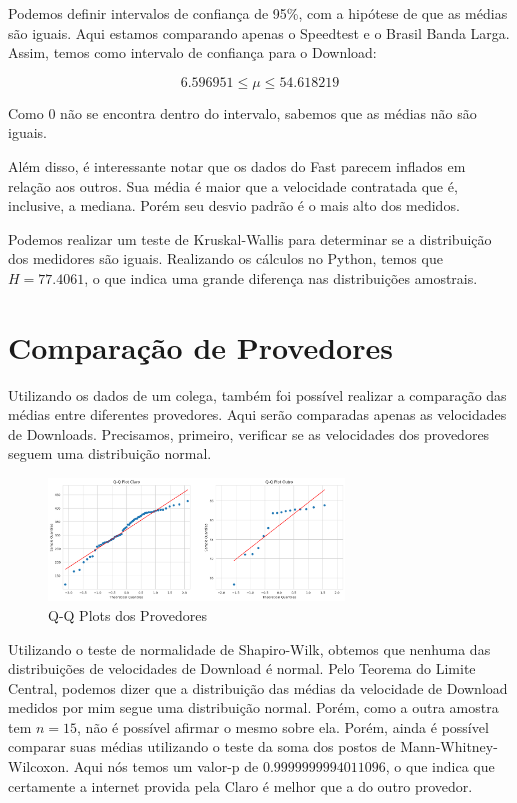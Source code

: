 \documentclass{report}
\begin{document}
Podemos definir intervalos de confiança de 95\%, com a hipótese de que as médias são iguais. Aqui estamos comparando apenas o Speedtest e o Brasil Banda Larga. Assim, temos como intervalo de confiança para o Download:

\[
    6.596951 \leq \mu \leq 54.618219
\]

Como 0 não se encontra dentro do intervalo, sabemos que as médias não são iguais.

Além disso, é interessante notar que os dados do Fast parecem inflados em relação aos outros. Sua média é maior que a velocidade contratada que é, inclusive, a mediana. Porém seu desvio padrão é o mais alto dos medidos.

Podemos realizar um teste de Kruskal-Wallis para determinar se a distribuição dos medidores são iguais. Realizando os cálculos no Python, temos que $ H = 77.4061 $, o que indica uma grande diferença nas distribuições amostrais.

\newpage

\section{Comparação de Provedores}

Utilizando os dados de um colega, também foi possível realizar a comparação das médias entre diferentes provedores. Aqui serão comparadas apenas as velocidades de Downloads. Precisamos, primeiro, verificar se as velocidades dos provedores seguem uma distribuição normal.

\begin{figure}[h]
    \caption{Q-Q Plots dos Provedores}
    \centering
    \includegraphics[width=0.7\textwidth]{qqplots.png}
\end{figure}

Utilizando o teste de normalidade de Shapiro-Wilk, obtemos que nenhuma das distribuições de velocidades de Download é normal. Pelo Teorema do Limite Central, podemos dizer que a distribuição das médias da velocidade de Download medidos por mim segue uma distribuição normal. Porém, como a outra amostra tem $n = 15$, não é possível afirmar o mesmo sobre ela. Porém, ainda é possível comparar suas médias utilizando o teste da soma dos postos de Mann-Whitney-Wilcoxon. Aqui nós temos um valor-p de $0.9999999994011096$, o que indica que certamente a internet provida pela Claro é melhor que a do outro provedor.
\end{document}

